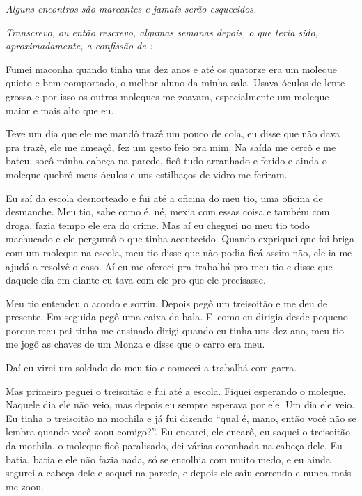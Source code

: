  

\emph{Alguns encontros são marcantes e jamais serão esquecidos.}

\emph{Transcrevo, ou então rescrevo, algumas semanas depois, o que
teria sido, aproximadamente, a confissão de :}

\bigskip{} 

Fumei maconha quando tinha uns dez anos e até os quatorze era um moleque
quieto e bem comportado, o melhor aluno da minha sala. Usava óculos de
lente grossa e por isso os outros moleques me zoavam, especialmente um
moleque maior e mais alto que eu.

Teve um dia que ele me mandô trazê um pouco de cola, eu disse que não
dava pra trazê, ele me ameaçô, fez um gesto feio pra mim. Na saída me
cercô e me bateu, socô minha cabeça na parede, ficô tudo arranhado e
ferido e ainda o moleque quebrô meus óculos e uns estilhaços de vidro me
feriram.

Eu saí da escola desnorteado e fui até a oficina do meu tio, uma oficina
de desmanche. Meu tio, sabe como é, né, mexia com essas coisa e também
com droga, fazia tempo ele era do crime. Mas aí eu cheguei no meu tio
todo machucado e ele perguntô o que tinha acontecido. Quando expriquei
que foi briga com um moleque na escola, meu tio disse que não podia ficá
assim não, ele ia me ajudá a resolvê o caso. Aí eu me ofereci pra
trabalhá pro meu tio e disse que daquele dia em diante eu tava com ele
pro que ele precisasse.

Meu tio entendeu o acordo e sorriu. Depois pegô um treisoitão e me deu
de presente. Em seguida pegô uma caixa de bala. E~como eu dirigia desde
pequeno porque meu pai tinha me ensinado dirigi quando eu tinha uns dez
ano, meu tio me jogô as chaves de um Monza e disse que o carro era meu.

Daí eu virei um soldado do meu tio e comecei a trabalhá com garra.

Mas primeiro peguei o treisoitão e fui até a escola. Fiquei esperando o
moleque. Naquele dia ele não veio, mas depois eu sempre esperava por
ele. Um dia ele veio. Eu tinha o treisoitão na mochila e já fui dizendo
``qual é, mano, então você não se lembra quando você zoou comigo?''. Eu
encarei, ele encarô, eu saquei o treisoitão da mochila, o moleque ficô
paralisado, dei várias coronhada na cabeça dele. Eu batia, batia e ele
não fazia nada, só se encolhia com muito medo, e eu ainda segurei a
cabeça dele e soquei na parede, e depois ele saiu correndo e nunca mais
me zoou.

